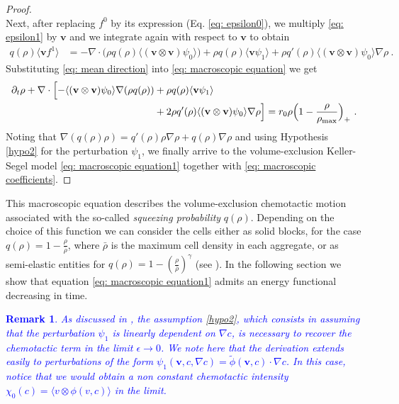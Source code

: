\documentclass{article}
\newtheorem{remark}{Remark}
\begin{document}
\begin{proof}
\begin{equation}
\end{equation}
Next, after replacing $f^0$ by its expression (Eq. \ref{eq: epsilon0}), we multiply \eqref{eq: epsilon1} by $\mathbf{v}$ and we integrate again with respect to $\mathbf{v}$ to obtain
\begin{align}
    q(\rho)\langle\mathbf{v}f^1\rangle&=- \nabla \cdot \big(\rho q(\rho) \langle(\mathbf{v}\otimes \mathbf{v})\psi_0\rangle \big)+\rho q(\rho)\langle \mathbf{v}\psi_1\rangle  +\rho q'(\rho) \langle(\mathbf{v}\otimes \mathbf{v})\psi_0\rangle  \nabla\rho\ .\label{eq: mean direction}
\end{align}
Substituting \eqref{eq: mean direction} into \eqref{eq: macroscopic equation} we get
\begin{align*}
    \partial_t\rho+\nabla\cdot\Bigl[-\langle(\mathbf{v}\otimes \mathbf{v}) \psi_0\rangle \nabla(\rho q(\rho))&+\rho q(\rho)\langle\mathbf{v} \psi_1\rangle \nonumber\\
    &+2 \rho q'(\rho)\langle(\mathbf{v}\otimes \mathbf{v})\psi_0\rangle\nabla\rho  \Bigr]={ r_0\rho\Bigl(1-\frac{\rho}{\rho_{\textnormal{max}}} \Bigr)_+}\ . 
\end{align*}
Noting that $\nabla(q(\rho)\rho)=q'(\rho)\rho\nabla\rho+q(\rho)\nabla\rho$ and using Hypothesis \ref{hypo2} for the perturbation $\psi_1$, we finally arrive to the volume-exclusion Keller-Segel model \eqref{eq: macroscopic equation1} together with \eqref{eq: macroscopic coefficients}.
\end{proof}


This macroscopic equation describes the
volume-exclusion chemotactic motion associated with the so-called \textit{squeezing probability} $q(\rho)$. Depending on the choice of this function we can consider the cells either as solid blocks, for the case $q(\rho)=1-\frac{\rho}{\bar{\rho}}$, where $\bar{\rho}$ is the maximum cell density in each aggregate, or as semi-elastic entities for $q(\rho)=1-\left(\frac{\rho}{\bar{\rho}} \right)^\gamma$ (see \cite{wang2007classical}). {In the following section we show that equation \eqref{eq: macroscopic equation1} admits an energy functional decreasing in time}. 

\textcolor{blue}{ \begin{remark}\label{remark}
As discussed in \cite{othmer2002diffusion}, the assumption \eqref{hypo2}, which consists in assuming that the perturbation $\psi_1$ is linearly dependent on $\nabla c$, is necessary to recover the chemotactic term in the limit $\epsilon \rightarrow 0$. We note here that the derivation extends easily to perturbations of the form $\psi_1(\mathbf{v},c,\nabla c) = \tilde{\phi}(\mathbf{v},c) \cdot \nabla c$. In this case, notice that we would obtain a non constant chemotactic intensity $\chi_0(c) = \langle v \otimes \phi(v,c) \rangle$ in the limit. 
\end{remark}}
\end{document}
